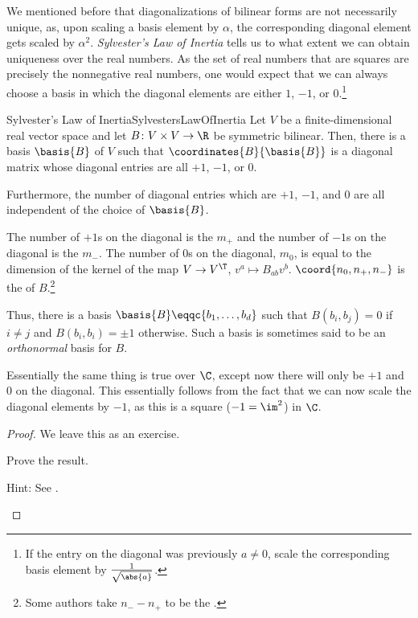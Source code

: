 We mentioned before that diagonalizations of bilinear forms are not necessarily unique, as, upon scaling a basis element by $\alpha$, the corresponding diagonal element gets scaled by $\alpha ^2$.  \emph{Sylvester's Law of Inertia} tells us to what extent we can obtain uniqueness over the real numbers.  As the set of real numbers that are squares are precisely the nonnegative real numbers, one would expect that we can always choose a basis in which the diagonal elements are either $1$, $-1$, or $0$.\footnote{If the entry on the diagonal was previously $a\neq 0$, scale the corresponding basis element by $\frac{1}{\sqrt{\abs{a}}}$.}
\begin{thm}{Sylvester's Law of Inertia}{SylvestersLawOfInertia}
	Let $V$ be a finite-dimensional real vector space and let $B\colon V\times V\rightarrow \R$ be symmetric bilinear.  Then, there is a basis $\basis{B}$ of $V$ such that $\coordinates{B}{\basis{B}}$ is a diagonal matrix whose diagonal entries are all $+1$, $-1$, or $0$.
	
	Furthermore, the number of diagonal entries which are $+1$, $-1$, and $0$ are all independent of the choice of $\basis{B}$.
	\begin{rmk}
		The number of $+1$s on the diagonal is the  $m_+$ and the number of $-1$s on the diagonal is the  $m_-$.  The number of $0$s on the diagonal, $m_0$, is equal to the dimension of the kernel of the map $V\rightarrow V^{\T}$, $v^a\mapsto B_{ab}v^b$.  $\coord{n_0,n_+,n_-}$ is the  of $B$.\footnote{Some authors take $n_--n_+$ to be the .}
	\end{rmk}
	\begin{rmk}
		Thus, there is a basis $\basis{B}\eqqc \{ b_1,\ldots ,b_d\}$ such that $B(b_i,b_j)=0$ if $i\neq j$ and $B(b_i,b_i)=\pm 1$ otherwise.  Such a basis is sometimes said to be an \emph{orthonormal} basis for $B$.
	\end{rmk}
	\begin{rmk}
		Essentially the same thing is true over $\C$, except now there will only be $+1$ and $0$ on the diagonal.  This essentially follows from the fact that we can now scale the diagonal elements by $-1$, as this is a square ($-1=\im ^2$) in $\C$.
	\end{rmk}
	\begin{proof}
		We leave this as an exercise.
		\begin{exr}[breakable=false]{}{}
			Prove the result.
			\begin{rmk}
				Hint:  See \cite[Theorem 6.38]{Friedberg}.
			\end{rmk}
		\end{exr}
	\end{proof}
\end{thm}

